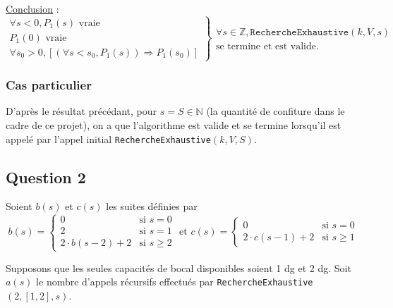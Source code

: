 \documentclass[12pt,a4paper]{article}
\begin{document}
\medskip
\underline{Conclusion} : 
\begin{equation*}
\left .\begin{array}{l}
\forall s < 0, P_{1}(s) \text{ vraie } \\
P_{1}(0) \text{ vraie } \\
\forall s_0 > 0, [(\forall s < s_0, P_{1}(s)) \Rightarrow P_{1}(s_0) ]
\end{array} \right \}
\left .\begin{array}{l}
\forall s \in \mathbb{Z}, \texttt{RechercheExhaustive}(k,V,s) \\
\text{se termine et est valide.}
\end{array}\right .
\end{equation*}
 
\subsubsection*{Cas particulier}
D'apr\`es le r\'esultat pr\'ec\'edant, pour $s = S \in \mathbb{N}$ (la quantit\'e de confiture dans le cadre de ce projet), on a que l'algorithme est valide et se termine lorsqu'il est appel\'e par l'appel initial \texttt{RechercheExhaustive}$(k,V,S)$. 

\subsection*{Question 2}
Soient $b(s)$ et $c(s)$ les suites d\'efinies par
\begin{equation*}
\left .b(s) = \begin{cases} 
      0 & \text{si } s = 0 \\
      2 & \text{si } s = 1 \\
      2\cdot b(s-2) + 2 & \text{si } s\geq 2 
   \end{cases} \right.
   \text{ et }
\left .c(s) = \begin{cases} 
      0 & \text{si } s = 0 \\
      2\cdot c(s-1) + 2 & \text{si } s\geq 1 
   \end{cases} \right.
\end{equation*}

Supposons que les seules capacit\'es de bocal disponibles soient 1 \si{dg} et 2 \si{dg}. Soit $a(s)$ le nombre d'appels r\'ecursifs effectu\'es par \texttt{RechercheExhaustive}$(2,[1,2],s)$.
\end{document}
